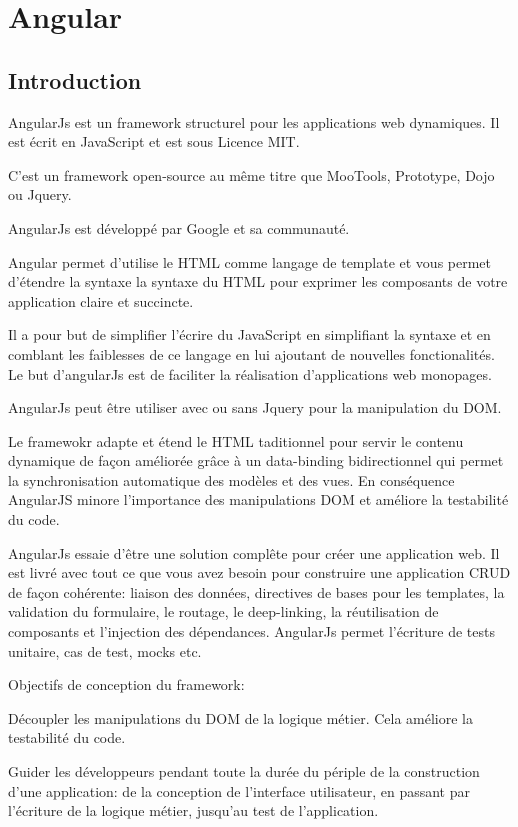 \chapter{Angular}
\label{ch:angular}

\section*{Introduction}

AngularJs est un framework structurel pour les applications web dynamiques. Il est écrit en  JavaScript et est sous Licence MIT.

C’est un framework open-source au même titre que MooTools, Prototype, Dojo ou Jquery.

AngularJs est développé par Google et sa communauté.

Angular permet d’utilise le HTML comme langage de template et vous permet d’étendre la syntaxe la syntaxe du HTML pour exprimer les composants de votre application claire et succincte.

Il a pour but de simplifier l’écrire du JavaScript en simplifiant la syntaxe et en comblant les faiblesses de ce langage en lui ajoutant de nouvelles fonctionalités. Le but d’angularJs est de faciliter la réalisation d’applications web monopages.

AngularJs peut être utiliser avec ou sans Jquery pour la manipulation du DOM.

Le framewokr adapte et étend le HTML taditionnel pour servir le contenu dynamique de façon améliorée grâce à un data-binding bidirectionnel qui permet la synchronisation automatique des modèles et des vues. En conséquence AngularJS minore l’importance des manipulations DOM et améliore la testabilité du code.

AngularJs essaie d’être une solution complête pour créer une application web. Il est livré avec tout ce que vous avez besoin pour construire une application CRUD de façon cohérente: liaison des données, directives de bases pour les templates, la validation du formulaire, le routage, le deep-linking, la réutilisation de composants et l’injection des dépendances. AngularJs permet l’écriture de tests unitaire, cas de test, mocks etc.

Objectifs de conception du framework:

    Découpler les manipulations du DOM de la logique métier. Cela améliore la testabilité du code.

    Guider les développeurs pendant toute la durée du périple de la construction d'une application: de la conception de l'interface utilisateur, en passant par l'écriture de la logique métier, jusqu'au test de l'application.

